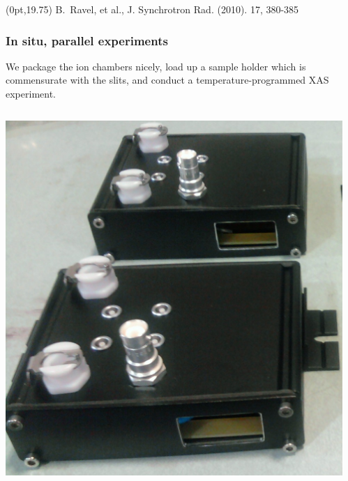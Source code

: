 \documentclass[10pt, xcolor=x11names, compress, handout]{beamer}
\begin{document}
\begin{frame}
\begin{columns}
\begin{column}{0.6\linewidth}
    \end{column}
  \end{columns}
  \begin{textblock*}{0.5\linewidth}(0pt,19.75\TPVertModule) 
    \tiny B.\ Ravel, et al., J. Synchrotron Rad. (2010). 17, 380-385 
  \end{textblock*}
\end{frame}

\begin{frame}
  \frametitle{In situ, parallel experiments}
  
  We package the ion chambers nicely, load up a sample holder which is
  commensurate with the slits, and conduct a temperature-programmed
  XAS experiment.

  \begin{columns}
    \begin{column}{0.4\linewidth}
      \includegraphics[width=\linewidth]{JM/blackboxes.jpg}
    \end{column}
    \begin{column}{0.25\linewidth}
      \begin{center}

\end{center}
\end{column}
\end{columns}
\end{frame}
\end{document}
